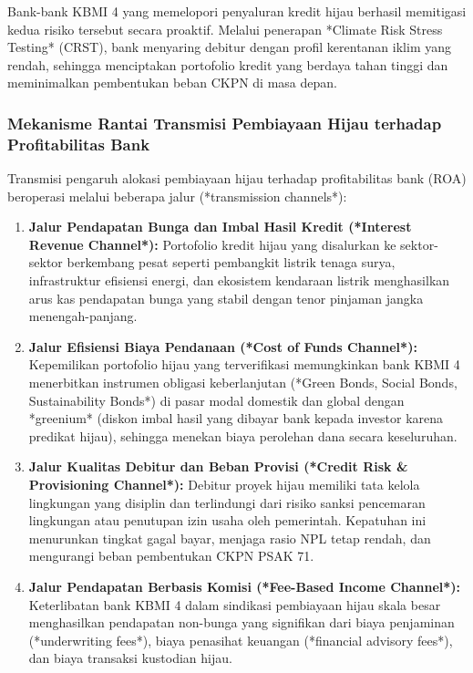 \documentclass[12pt,a4paper]{article}
\numberwithin{equation}{section}
\begin{document}
\noindent
Bank-bank KBMI 4 yang memelopori penyaluran kredit hijau berhasil memitigasi kedua risiko tersebut secara proaktif. Melalui penerapan *Climate Risk Stress Testing* (CRST), bank menyaring debitur dengan profil kerentanan iklim yang rendah, sehingga menciptakan portofolio kredit yang berdaya tahan tinggi dan meminimalkan pembentukan beban CKPN di masa depan.

\subsubsection{Mekanisme Rantai Transmisi Pembiayaan Hijau terhadap Profitabilitas Bank}
\noindent
Transmisi pengaruh alokasi pembiayaan hijau terhadap profitabilitas bank (ROA) beroperasi melalui beberapa jalur (*transmission channels*):
\begin{enumerate}
  \item \textbf{Jalur Pendapatan Bunga dan Imbal Hasil Kredit (*Interest Revenue Channel*):} Portofolio kredit hijau yang disalurkan ke sektor-sektor berkembang pesat seperti pembangkit listrik tenaga surya, infrastruktur efisiensi energi, dan ekosistem kendaraan listrik menghasilkan arus kas pendapatan bunga yang stabil dengan tenor pinjaman jangka menengah-panjang.
  \item \textbf{Jalur Efisiensi Biaya Pendanaan (*Cost of Funds Channel*):} Kepemilikan portofolio hijau yang terverifikasi memungkinkan bank KBMI 4 menerbitkan instrumen obligasi keberlanjutan (*Green Bonds, Social Bonds, Sustainability Bonds*) di pasar modal domestik dan global dengan *greenium* (diskon imbal hasil yang dibayar bank kepada investor karena predikat hijau), sehingga menekan biaya perolehan dana secara keseluruhan.
  \item \textbf{Jalur Kualitas Debitur dan Beban Provisi (*Credit Risk \& Provisioning Channel*):} Debitur proyek hijau memiliki tata kelola lingkungan yang disiplin dan terlindungi dari risiko sanksi pencemaran lingkungan atau penutupan izin usaha oleh pemerintah. Kepatuhan ini menurunkan tingkat gagal bayar, menjaga rasio NPL tetap rendah, dan mengurangi beban pembentukan CKPN PSAK 71.
  \item \textbf{Jalur Pendapatan Berbasis Komisi (*Fee-Based Income Channel*):} Keterlibatan bank KBMI 4 dalam sindikasi pembiayaan hijau skala besar menghasilkan pendapatan non-bunga yang signifikan dari biaya penjaminan (*underwriting fees*), biaya penasihat keuangan (*financial advisory fees*), dan biaya transaksi kustodian hijau.
\end{enumerate}
\end{document}
